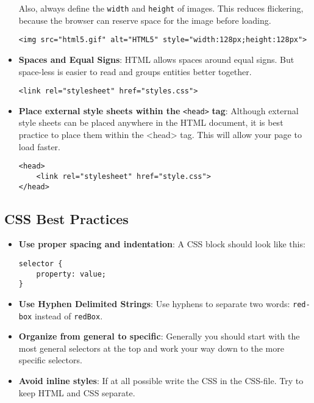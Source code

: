 \documentclass[english,11pt,a4paper]{report}
\newcommand{\bfb}[1]{{\bf \color{blue} #1}}
\begin{document}
\begin{itemize}
Also, always define the \verb|width| and \verb|height| of images. This reduces flickering, because the browser can reserve space for the image before loading.
\begin{lstlisting}[style=htmlcssjs]
<img src="html5.gif" alt="HTML5" style="width:128px;height:128px">
\end{lstlisting}

\item \bfb{Spaces and Equal Signs}: HTML allows spaces around equal signs. But space-less is easier to read and groups entities better together.

\begin{lstlisting}[style=htmlcssjs]
<link rel="stylesheet" href="styles.css">
\end{lstlisting}

\item \bfb{Place external style sheets within the} \verb|<head>| \bfb{tag}: Although external style sheets can be placed anywhere in the HTML document, it is best practice to place them within the <head> tag. This will allow your page to load faster.

\begin{lstlisting}[style=htmlcssjs]
<head>
    <link rel="stylesheet" href="style.css">
</head>
\end{lstlisting}


\end{itemize}


\subsection{CSS Best Practices}

\begin{itemize}
\item \bfb{Use proper spacing and indentation}: A CSS block should look like this:
\begin{lstlisting}[style=htmlcssjs]
selector {
    property: value;
}
\end{lstlisting}


\item \bfb{Use Hyphen Delimited Strings}: Use hyphens to separate two words: \verb|red-box| instead of \verb|redBox|. 

\item \bfb{Organize from general to specific}: Generally you should start with the most general selectors at the top and work your way down to the more specific selectors.  

\item \bfb{Avoid inline styles}: If at all possible write the CSS in the CSS-file. Try to keep HTML and CSS separate.
\end{itemize}
\end{document}

